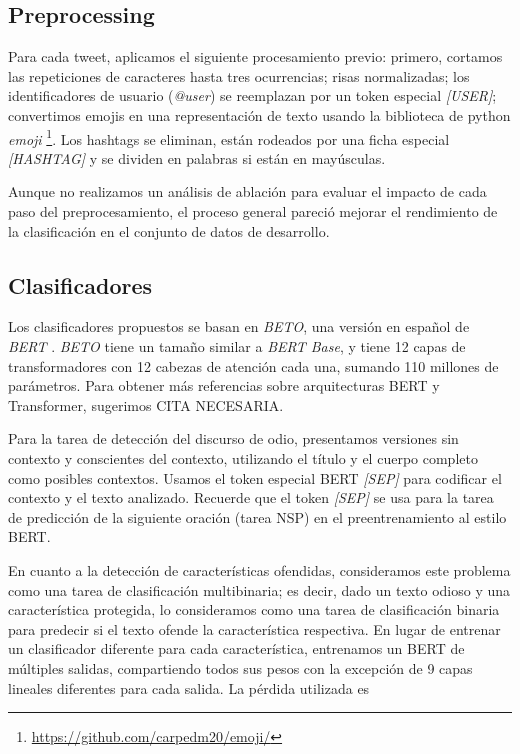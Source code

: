 \subsection{Preprocessing}

Para cada tweet, aplicamos el siguiente procesamiento previo: primero, cortamos las repeticiones de caracteres hasta tres ocurrencias; risas normalizadas; los identificadores de usuario (\emph{@user}) se reemplazan por un token especial \emph{[USER]}; convertimos emojis en una representación de texto usando la biblioteca de python \emph{emoji} \footnote {\url{https://github.com/carpedm20/emoji/}}. Los hashtags se eliminan, están rodeados por una ficha especial \emph{[HASHTAG]} y se dividen en palabras si están en mayúsculas.

Aunque no realizamos un análisis de ablación para evaluar el impacto de cada paso del preprocesamiento, el proceso general pareció mejorar el rendimiento de la clasificación en el conjunto de datos de desarrollo.

\subsection{Clasificadores}

Los clasificadores propuestos se basan en \emph{BETO}\cite{canete2020spanish}, una versión en español de \emph{BERT} \cite{devlin2018bert}. \emph{BETO} tiene un tamaño similar a \emph {BERT Base}, y tiene 12 capas de transformadores con 12 cabezas de atención cada una, sumando 110 millones de parámetros. Para obtener más referencias sobre arquitecturas BERT y Transformer, sugerimos CITA NECESARIA.

Para la tarea de detección del discurso de odio, presentamos versiones sin contexto y conscientes del contexto, utilizando el título y el cuerpo completo como posibles contextos. Usamos el token especial BERT \emph {[SEP]} para codificar el contexto y el texto analizado. Recuerde que el token \emph {[SEP]} se usa para la tarea de predicción de la siguiente oración (tarea NSP) en el preentrenamiento al estilo BERT.

En cuanto a la detección de características ofendidas, consideramos este problema como una tarea de clasificación multibinaria; es decir, dado un texto odioso y una característica protegida, lo consideramos como una tarea de clasificación binaria para predecir si el texto ofende la característica respectiva. En lugar de entrenar un clasificador diferente para cada característica, entrenamos un BERT de múltiples salidas, compartiendo todos sus pesos con la excepción de 9 capas lineales diferentes para cada salida. La pérdida utilizada es

